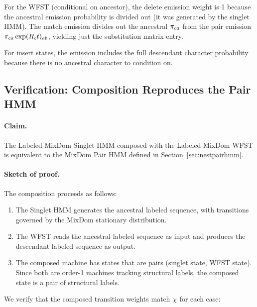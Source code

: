 For the WFST (conditional on ancestor), the delete emission weight is 1 because the
ancestral emission probability is divided out (it was generated by the singlet HMM).
The match emission divides out the ancestral $\pi_{ca}$ from the pair emission
$\pi_{ca} \exp(R_c t)_{ab}$,
yielding just the substitution matrix entry.

For insert states, the emission includes the full descendant character probability
because there is no ancestral character to condition on.


\subsection{Verification: Composition Reproduces the Pair HMM}
\label{sec:verification}

\paragraph{Claim.}
The Labeled-MixDom Singlet HMM composed with the Labeled-MixDom WFST
is equivalent to the MixDom Pair HMM defined in Section~\ref{sec:nestpairhmm}.

\paragraph{Sketch of proof.}
The composition proceeds as follows:
\begin{enumerate}
\item The Singlet HMM generates the ancestral labeled sequence, with transitions
  governed by the MixDom stationary distribution.
\item The WFST reads the ancestral labeled sequence as input and produces
  the descendant labeled sequence as output.
\item The composed machine has states that are pairs (singlet state, WFST state).
  Since both are order-1 machines tracking structural labels, the composed state
  is a pair of structural labels.
\end{enumerate}

We verify that the composed transition weights match $\chi$ for each case:

